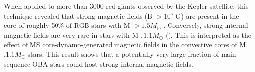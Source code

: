 When applied to more than 3000 red giants observed by the Kepler satellite, this technique revealed that
strong magnetic fields (B $> 10^5$ G) are present in the core of roughly 50\% of RGB stars with M $> 1.5M_\odot$ \citep{Stello_2016}.
Conversely, strong internal magnetic fields are very rare in stars with M $, 1.1M_\odot$ (\color). This is interpreted as the
effect of MS core-dynamo-generated magnetic fields in the convective cores of M $. 1.1M_\odot$ stars.
This result shows that a potentially very large fraction of main sequence OBA stars could host strong internal magnetic fields.



